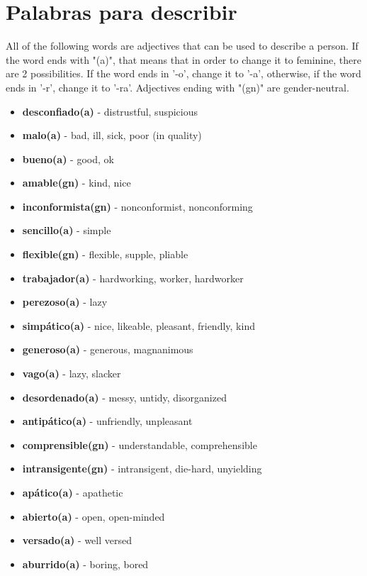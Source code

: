 \documentclass[12pt]{article}
\begin{document}
    \section{Palabras para describir}
        All of the following words are adjectives that can be used to describe a person. If the word ends
        with "(a)", that means that in order to change it to feminine, there are 2 possibilities. If the word
        ends in '-o', change it to '-a', otherwise, if the word ends in '-r', change it to '-ra'.
        Adjectives ending with "(gn)" are gender-neutral.
        \begin{itemize}
            \item \textbf{desconfiado(a)} - distrustful, suspicious
            \item \textbf{malo(a)} - bad, ill, sick, poor (in quality)
            \item \textbf{bueno(a)} - good, ok
            \item \textbf{amable(gn)} - kind, nice
            \item \textbf{inconformista(gn)} - nonconformist, nonconforming
            \item \textbf{sencillo(a)} - simple
            \item \textbf{flexible(gn)} - flexible, supple, pliable
            \item \textbf{trabajador(a)} - hardworking, worker, hardworker
            \item \textbf{perezoso(a)} - lazy
            \item \textbf{simpático(a)} - nice, likeable, pleasant, friendly, kind
            \item \textbf{generoso(a)} - generous, magnanimous
            \item \textbf{vago(a)} - lazy, slacker
            \item \textbf{desordenado(a)} - messy, untidy, disorganized
            \item \textbf{antipático(a)} - unfriendly, unpleasant
            \item \textbf{comprensible(gn)} - understandable, comprehensible
            \item \textbf{intransigente(gn)} - intransigent, die-hard, unyielding
            \item \textbf{apático(a)} - apathetic
            \item \textbf{abierto(a)} - open, open-minded
            \item \textbf{versado(a)} - well versed
            \item \textbf{aburrido(a)} - boring, bored

\end{itemize}
\end{document}
